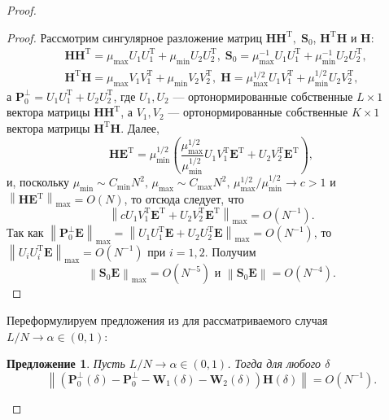 \documentclass[specialist,
substylefile = spbu_report.rtx,
subf,href,colorlinks=true, 12pt]{disser}
\newcommand\norm[1]{\left\|#1\right\|}
\newtheorem{sentence}{Предложение}
\begin{document}
\begin{proof}
		\begin{proof}
			Рассмотрим сингулярное разложение матриц $\mathbf{HH}^\mathrm{T},\;\mathbf{S}_0$, $\mathbf{H}^\mathrm{T}\mathbf{H}$ и $\mathbf{H}$:
			\begin{align*}
				&\mathbf{HH}^\mathrm{T} = \mu_{\max}U_1U_1^\mathrm{T}+\mu_{\min}U_2U_2^\mathrm{T},\; \mathbf{S}_0=\mu_{\max}^{-1}U_1U_1^\mathrm{T}+\mu_{\min}^{-1}U_2U_2^\mathrm{T},\\
				&\mathbf{H}^\mathrm{T}\mathbf{H}=\mu_{\max}V_1V_1^\mathrm{T}+\mu_{\min}V_2V_2^\mathrm{T},\;\mathbf{H}=\mu_{\max}^{1/2}U_1V_1^\mathrm{T}+\mu_{\min}^{1/2}U_2V_2^\mathrm{T},
			\end{align*}
			а $\mathbf{P}_0^\bot = U_1U_1^\mathrm{T} + U_2U_2^\mathrm{T}$, где $U_1,U_2$ --- ортонормированные собственные $L\times 1$ вектора матрицы $\mathbf{HH}^\mathrm{T}$, а $V_1, V_2$ --- ортонормированные собственные $K\times 1$ вектора матрицы $\mathbf{H}^\mathrm{T}\mathbf{H}$. Далее,
			\begin{equation*}
				\mathbf{HE}^\mathrm{T} = \mu_{\min}^{1/2}\left(\dfrac{\mu_{\max}^{1/2}}{\mu_{\min}^{1/2}}U_1V_1^\mathrm{T}\mathbf{E}^\mathrm{T}+U_2V_2^\mathrm{T}\mathbf{E}^\mathrm{T}\right),
			\end{equation*}
			и, поскольку $\mu_{\min}\sim C_{\min}N^2,\,\mu_{\max}\sim C_{\max}N^2,\,\mu_{\max}^{1/2}/\mu_{\min}^{1/2}\rightarrow c>1$ и $\norm{\mathbf{HE}^\mathrm{T}}_{\max}=O(N)$, то отсюда следует, что
			\begin{equation*}
				\norm{cU_1V_1^\mathrm{T}\mathbf{E}^\mathrm{T}+U_2V_2^\mathrm{T}\mathbf{E}^\mathrm{T}}_{\max}=O(N^{-1}).
			\end{equation*}
			Так как $\norm{\mathbf{P}_0^\bot\mathbf{E}}_{\max}=\norm{U_1U_1^\mathrm{T}\mathbf{E}+U_2U_2^\mathrm{T}\mathbf{E}}_{\max}=O(N^{-1})$, то $\norm{U_iU_i^\mathrm{T}\mathbf{E}}_{\max}=O(N^{-1})$ при $i=1,2$. Получим
			\begin{equation*}
				\norm{\mathbf{S}_0\mathbf{E}}_{\max}=O(N^{-5}) \textrm{ и } \norm{\mathbf{S}_0\mathbf{E}}=O(N^{-4}).
			\end{equation*} 
		\end{proof}
		Переформулируем предложения из \cite{ZNekrutkin} для рассматриваемого случая $L/N\rightarrow\alpha\in(0,1)$:
		\begin{sentence}
			Пусть $L/N\rightarrow\alpha\in(0,1)$. Тогда для любого $\delta$
			\begin{equation*}
				\norm{\left(\mathbf{P}_0^\bot(\delta) - \mathbf{P}_0^\bot - \mathbf{W}_1(\delta) - \mathbf{W}_2(\delta)\right)\mathbf{H}(\delta)} = O(N^{-1}).
			\end{equation*}
		\end{sentence}
		

\end{proof}
\end{document}
